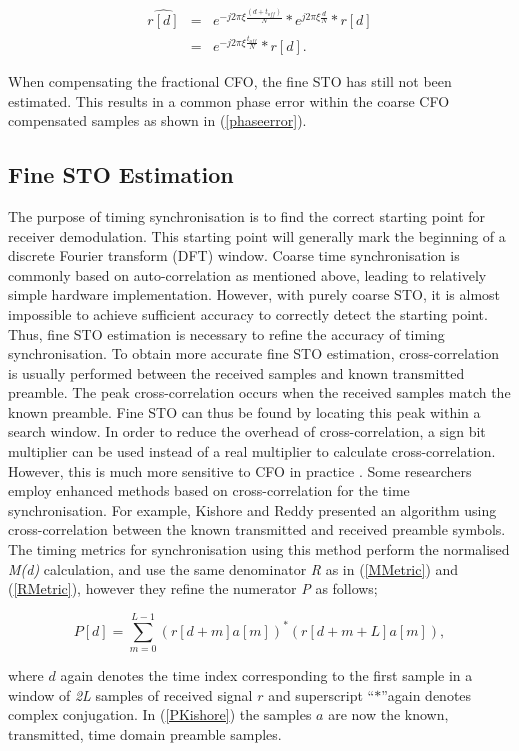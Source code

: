 \begin{eqnarray}
\label{phaseerror}
\widehat{r[d]} &=&  e^{-j2\pi\xi \frac{(d+t_{off})}{N}}*e^{j2\pi\xi \frac{d}{N}}*r[d] \nonumber \\
&=& e^{-j2\pi\xi \frac{t_{off}}{N}}*r[d].
\end{eqnarray}

When compensating the fractional CFO, the fine STO has still not been estimated. This results in a common phase error within the coarse CFO compensated samples as shown in (\ref{phaseerror}).

\subsection{Fine STO Estimation}

The purpose of timing synchronisation is to find the correct starting point for receiver demodulation.
This starting point will generally mark the beginning of a discrete Fourier transform (DFT) window. 
Coarse time synchronisation is commonly based on auto-correlation as mentioned above, leading to relatively simple hardware implementation. 
However, with purely coarse STO, it is almost impossible to achieve sufficient accuracy to correctly detect the starting point.
Thus,  fine STO estimation is necessary to refine the accuracy of timing synchronisation. 
To obtain more accurate fine STO estimation, cross-correlation is usually performed between the received samples and known transmitted preamble. 
The peak cross-correlation occurs when the received samples match the known preamble. 
Fine STO can thus be found by locating this peak within a search window. 
In order to reduce the overhead of cross-correlation, a sign bit multiplier can be used instead of a real multiplier to calculate cross-correlation. However, this is much more sensitive to CFO in practice \cite{Schwoerer2002}. Some researchers employ enhanced methods based on cross-correlation for the time synchronisation. 
For example, Kishore and Reddy \cite{Kishore2006} presented an algorithm using cross-correlation between the known transmitted and received preamble symbols. 
The timing metrics for synchronisation using this method perform the normalised \emph{M(d)} calculation, and use the same denominator \emph{R} as in (\ref{MMetric}) and (\ref{RMetric}), however they refine the numerator \emph{P} as follows;
\begin{center}
\begin{equation}
\label{PKishore}
P[d] =\sum_{m =0}^{L-1}    (r[d+m] a[m])^{*} (r[d+m+L] a[m]),
\end{equation}
\end{center} 
where $d$ again denotes the time index corresponding to the first sample in a window of \emph{2L} samples of received signal $r$ and superscript \textquotedblleft$*$\textquotedblright again denotes complex conjugation. In (\ref{PKishore}) the samples $a$ are now the known, transmitted, time domain preamble samples.

